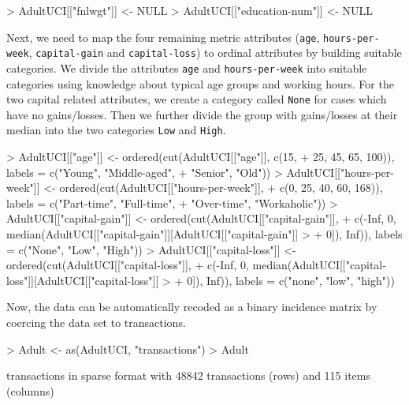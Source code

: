 \documentclass[10pt,a4paper]{article}
\newcommand{\class}[1]{\mbox{\textsf{#1}}}
\newcommand{\code}[1]{\mbox{\texttt{#1}}}
\begin{document}
\begin{Schunk}
\begin{Sinput}
> AdultUCI[["fnlwgt"]] <- NULL
> AdultUCI[["education-num"]] <- NULL
\end{Sinput}
\end{Schunk}

Next, we need to map the four remaining metric attributes (\code{age},
\code{hours-per-week}, \code{capital-gain} and \code{capital-loss}) to ordinal
attributes by building suitable categories.
We divide the attributes \code{age} and \code{hours-per-week}
into suitable categories using knowledge about typical age groups 
and working hours. 
For the two capital related attributes,
we create a category called \code{None} 
for cases which have no gains/losses. 
Then we further divide the group with gains/losses
at their median into the two categories \code{Low} and \code{High}.


\begin{Schunk}
\begin{Sinput}
> AdultUCI[["age"]] <- ordered(cut(AdultUCI[["age"]], c(15, 
+     25, 45, 65, 100)), labels = c("Young", "Middle-aged", 
+     "Senior", "Old"))
> AdultUCI[["hours-per-week"]] <- ordered(cut(AdultUCI[["hours-per-week"]], 
+     c(0, 25, 40, 60, 168)), labels = c("Part-time", "Full-time", 
+     "Over-time", "Workaholic"))
> AdultUCI[["capital-gain"]] <- ordered(cut(AdultUCI[["capital-gain"]], 
+     c(-Inf, 0, median(AdultUCI[["capital-gain"]][AdultUCI[["capital-gain"]] > 
+         0]), Inf)), labels = c("None", "Low", "High"))
> AdultUCI[["capital-loss"]] <- ordered(cut(AdultUCI[["capital-loss"]], 
+     c(-Inf, 0, median(AdultUCI[["capital-loss"]][AdultUCI[["capital-loss"]] > 
+         0]), Inf)), labels = c("none", "low", "high"))
\end{Sinput}
\end{Schunk}

Now, the data can be automatically recoded as
a binary incidence matrix by coercing the data set to
\class{transactions}.

\begin{Schunk}
\begin{Sinput}
> Adult <- as(AdultUCI, "transactions")
> Adult
\end{Sinput}
\begin{Soutput}
transactions in sparse format with
 48842 transactions (rows) and
 115 items (columns)
\end{Soutput}
\end{Schunk}
\end{document}
